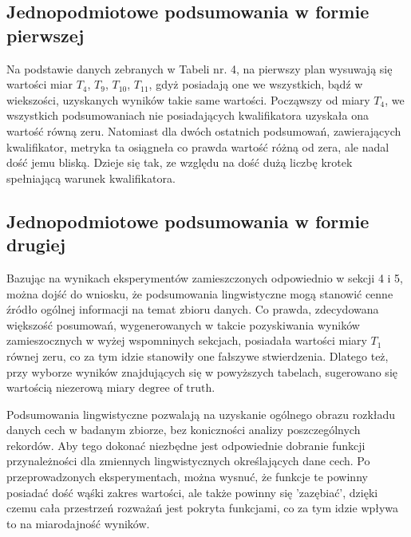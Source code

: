 \documentclass{classrep}
\begin{document}
\subsection{Jednopodmiotowe podsumowania w formie pierwszej}

Na podstawie danych zebranych w Tabeli nr. 4, na pierwszy plan wysuwają się wartości miar $T_4$, $T_9$, $T_{10}$, $T_{11}$, gdyż posiadają one we wszystkich, bądź w wiekszości, uzyskanych wyników takie same wartości. 
Począwszy od miary $T_4$, we wszystkich podsumowaniach nie posiadających kwalifikatora uzyskała ona wartość równą zeru. Natomiast dla dwóch ostatnich podsumowań, zawierających kwalifikator, metryka ta osiągneła co prawda wartość różną od zera, ale nadal dość jemu bliską. Dzieje się tak, ze względu na dość dużą liczbę krotek spełniającą warunek kwalifikatora.

\subsection{Jednopodmiotowe podsumowania w formie drugiej}

Bazując na wynikach eksperymentów zamieszczonych odpowiednio w sekcji 4 i 5, można dojść do wniosku, że podsumowania lingwistyczne
mogą stanowić cenne źródło ogólnej informacji na temat zbioru danych. Co prawda, zdecydowana większość posumowań, wygenerowanych w takcie pozyskiwania wyników zamieszocznych w wyżej 
wspomninych sekcjach, posiadała wartości miary \(T_1\) równej zeru, co za tym idzie stanowiły one fałszywe stwierdzenia. Dlatego też, przy wyborze wyników znajdujących się w powyższych tabelach, sugerowano się 
wartością niezerową miary \(\text{degree of truth}\).

Podsumowania lingwistyczne pozwalają na uzyskanie ogólnego obrazu rozkładu danych cech w badanym zbiorze, bez koniczności analizy poszczególnych rekordów. Aby tego dokonać niezbędne jest odpowiednie dobranie funkcji przynależności
dla zmiennych lingwistycznych określających dane cech. Po przeprowadzonych eksperymentach, można wysnuć, że funkcje te powinny posiadać dość wąśki zakres wartości, ale także powinny się 'zazębiać', dzięki czemu cała przestrzeń rozważań jest pokryta funkcjami, co za tym idzie wpływa to na 
miarodajność wyników.
\end{document}
